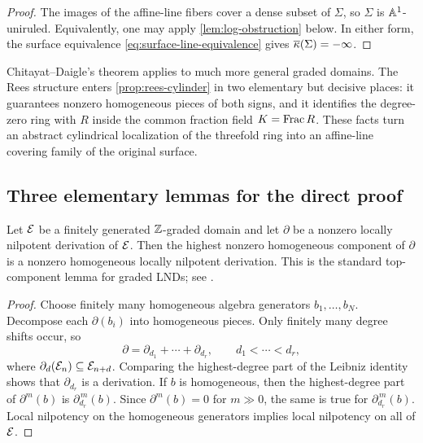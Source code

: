 \begin{proof}
The images of the affine-line fibers cover a dense subset of $\Sigma$, so $\Sigma$ is $\mathbb A^1$-uniruled.  Equivalently, one may apply \cref{lem:log-obstruction} below.  In either form, the surface equivalence \eqref{eq:surface-line-equivalence} gives $\overline\kappa(\Sigma)=-\infty$.
\end{proof}

\begin{remark}\label{rem:rees-specific}
Chitayat--Daigle's theorem applies to much more general graded domains.  The Rees structure enters \cref{prop:rees-cylinder} in two elementary but decisive places: it guarantees nonzero homogeneous pieces of both signs, and it identifies the degree-zero ring with $R$ inside the common fraction field $K=\operatorname{Frac} R$.  These facts turn an abstract cylindrical localization of the threefold ring into an affine-line covering family of the original surface.
\end{remark}

\subsection{Three elementary lemmas for the direct proof}


\begin{lemma}\label{lem:top-component}
Let $\mathcal E$ be a finitely generated $\mathbb Z$-graded domain and let $\partial$ be a nonzero locally nilpotent derivation of $\mathcal E$.  Then the highest nonzero homogeneous component of $\partial$ is a nonzero homogeneous locally nilpotent derivation.  This is the standard top-component lemma for graded LNDs; see \cite[Section 1.1]{Freudenburg2017}.
\end{lemma}

\begin{proof}
Choose finitely many homogeneous algebra generators $b_1,\dots,b_N$.  Decompose each $\partial(b_i)$ into homogeneous pieces.  Only finitely many degree shifts occur, so
\[
  \partial=\partial_{d_1}+\cdots+\partial_{d_r},
  \qquad d_1<\cdots<d_r,
\]
where $\partial_d(\mathcal E_n)\subseteq \mathcal E_{n+d}$.  Comparing the highest-degree part of the Leibniz identity shows that $\partial_{d_r}$ is a derivation.  If $b$ is homogeneous, then the highest-degree part of $\partial^m(b)$ is $\partial_{d_r}^{\,m}(b)$.  Since $\partial^m(b)=0$ for $m\gg0$, the same is true for $\partial_{d_r}^{\,m}(b)$.  Local nilpotency on the homogeneous generators implies local nilpotency on all of $\mathcal E$.
\end{proof}

